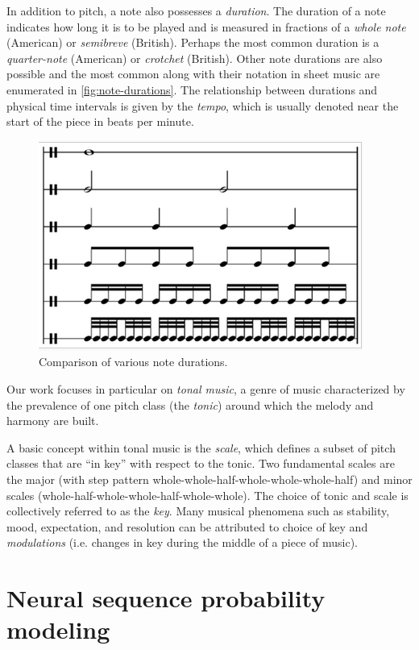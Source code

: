 In addition to pitch, a note also possesses a \emph{duration}. The duration of
a note indicates how long it is to be played and is measured in fractions of a
\emph{whole note} (American) or \emph{semibreve} (British). Perhaps the most
common duration is a \emph{quarter-note} (American) or \emph{crotchet}
(British). Other note durations are also possible and the most common along
with their notation in sheet music are enumerated in
\autoref{fig:note-durations}. The relationship between durations and
physical time intervals is given by the \emph{tempo}, which is usually
denoted near the start of the piece in beats per minute.

\begin{figure}[htpb]
    \centering
    \includegraphics[width=0.6\linewidth]{Figures/note-durations.png}
    \caption{Comparison of various note durations. }
    \label{fig:note-durations}
\end{figure}

Our work focuses in particular on \emph{tonal music}, a genre of music
characterized by the prevalence of one pitch class (the \emph{tonic}) around
which the melody and harmony are built.

A basic concept within tonal music is the \emph{scale}, which defines a subset
of pitch classes that are ``in key'' with respect to the tonic. Two fundamental
scales are the major (with step pattern
whole-whole-half-whole-whole-whole-half) and minor scales
(whole-half-whole-whole-half-whole-whole). The choice of tonic and scale is
collectively referred to as the \emph{key}. Many musical phenomena such as
stability, mood, expectation, and resolution can be attributed to choice of key
and \emph{modulations} (i.e. changes in key during the middle of a piece of
music).

\section{Neural sequence probability modeling}

